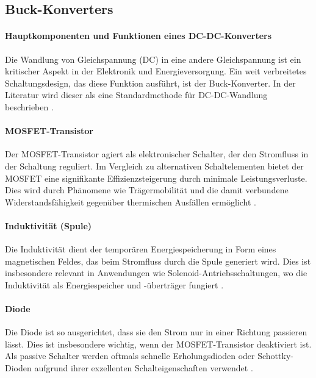 \subsection{Buck-Konverters}

\paragraph{Hauptkomponenten und Funktionen eines DC-DC-Konverters}

Die Wandlung von Gleichspannung (DC) in eine andere Gleichspannung ist ein kritischer Aspekt in der Elektronik und Energieversorgung. Ein weit verbreitetes Schaltungsdesign, das diese Funktion ausführt, ist der Buck-Konverter. In der Literatur wird dieser als eine Standardmethode für DC-DC-Wandlung beschrieben \cite[p.~66]{wensdesign2022}.



\paragraph{MOSFET-Transistor}
Der MOSFET-Transistor agiert als elektronischer Schalter, der den Stromfluss in der Schaltung reguliert. Im Vergleich zu alternativen Schaltelementen bietet der MOSFET eine signifikante Effizienzsteigerung durch minimale Leistungsverluste. Dies wird durch Phänomene wie Trägermobilität und die damit verbundene Widerstandsfähigkeit gegenüber thermischen Ausfällen ermöglicht \cite[p.~29]{choi2013pulsewidth}.

\paragraph{Induktivität (Spule)}
Die Induktivität dient der temporären Energiespeicherung in Form eines magnetischen Feldes, das beim Stromfluss durch die Spule generiert wird. Dies ist insbesondere relevant in Anwendungen wie Solenoid-Antriebsschaltungen, wo die Induktivität als Energiespeicher und -überträger fungiert \cite[p.~54]{choi2013pulsewidth}.

\paragraph{Diode}
Die Diode ist so ausgerichtet, dass sie den Strom nur in einer Richtung passieren lässt. Dies ist insbesondere wichtig, wenn der MOSFET-Transistor deaktiviert ist. Als passive Schalter werden oftmals schnelle Erholungsdioden oder Schottky-Dioden aufgrund ihrer exzellenten Schalteigenschaften verwendet \cite[p.~29]{choi2013pulsewidth}.

